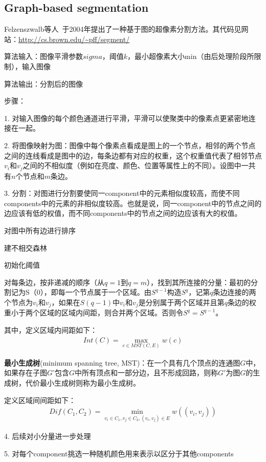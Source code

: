 \documentclass[12pt]{article}
\begin{document}
\subsection{Graph-based segmentation}

Felzenszwalb等人~\cite{felzenszwalb2004efficient}于2004年提出了一种基于图的超像素分割方法。其代码见网站：\url{http://cs.brown.edu/~pff/segment/}

算法输入：图像平滑参数$sigma$，阈值$k$，最小超像素大小min（由后处理阶段所限制），输入图像

算法输出：分割后的图像

步骤：

1. 对输入图像的每个颜色通道进行平滑，平滑可以使聚类中的像素点更紧密地连接在一起。

2. 将图像映射为图：图像中每个像素点看成是图上的一个节点，相邻的两个节点之间的连线看成是图中的边，每条边都有对应的权重，这个权重值代表了相邻节点$v_i$和$v_j$之间的不相似度（例如在亮度、颜色、位置等属性上的不同）。设图中一共有$n$个节点和$m$条边。

3. 分割：对图进行分割要使同一component中的元素相似度较高，而使不同components中的元素的非相似度较高。也就是说，同一component中的节点之间的边应该有低的权值，而不同components中的节点之间的边应该有大的权值。

对图中所有边进行排序

建不相交森林

初始化阈值

对每条边，按非递减的顺序（从$q=1$到$q=m$），找到其所连接的分量：最初的分割记为S（0），即每一个节点属于一个区域。由$S^{q-1}$构造$S^q$，记第$q$条边连接的两个节点为$v_i$和$v_j$，如果在$S(q-1)$中$v_i$和$v_j$是分别属于两个区域并且第$q$条边的权重小于两个区域的区域内间距，则合并两个区域。否则令$S^q = S^{q-1}$。

其中，定义区域内间距如下：
\begin{align}
Int(C) = \max_{c \in MST(C, E)}w(c)
\end{align}

\textbf{最小生成树}(minimum spanning tree, MST)：在一个具有几个顶点的连通图$G$中，如果存在子图$G$'包含$G$中所有顶点和一部分边，且不形成回路，则称$G'$为图$G$的生成树，代价最小生成树则称为最小生成树。

定义区域间间距如下：
\begin{align}
Dif(C_1, C_2) = \min_{v_i \in C_1, v_j \in C_2, (v_i, v_j)\in E}w((v_i, v_j))
\end{align}

4. 后续对小分量进一步处理

5. 对每个component挑选一种随机颜色用来表示以区分于其他components
\end{document}
